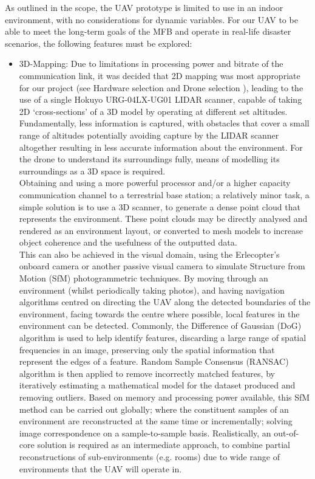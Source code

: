\documentclass[capstone_report.tex]{subfiles}
\begin{document}
As outlined in the scope, the UAV prototype is limited to use in an indoor environment, with no considerations for dynamic variables. For our UAV to be able to meet the long-term goals of the MFB and operate in real-life disaster scenarios, the following features must be explored:
\begin{itemize}
\item 3D-Mapping: Due to limitations in processing power and bitrate of the communication link, it was decided that 2D mapping was most appropriate for our project (see Hardware selection and Drone selection ), leading to the use of a single Hokuyo URG-04LX-UG01 LIDAR scanner, capable of taking 2D ‘cross-sections’ of a 3D model by operating at different set altitudes. Fundamentally, less information is captured, with obstacles that cover a small range of altitudes potentially avoiding capture by the LIDAR scanner altogether resulting in less accurate information about the environment. For the drone to understand its surroundings fully, means of modelling its surroundings as a 3D space is required.  \\

Obtaining and using a more powerful processor and/or a higher capacity communication channel to a terrestrial base station; a relatively minor task, a simple solution is to use a 3D scanner, to generate a dense point cloud that represents the environment. These point clouds may be directly analysed and rendered as an environment layout, or converted to mesh models to increase object coherence and the usefulness of the outputted data. \\

This can also be achieved in the visual domain, using the Erlecopter’s onboard camera or another passive visual camera to simulate Structure from Motion (SfM) photogrammetric techniques. By moving through an environment (whilst periodically taking photos), and having navigation algorithms centred on directing the UAV along the detected boundaries of the environment, facing towards the centre where possible, local features in the environment can be detected. Commonly, the Difference of Gaussian (DoG) algorithm is used to help identify features, discarding a large range of spatial frequencies in an image, preserving only the spatial information that represent the edges of a feature. Random Sample Consensus (RANSAC) algorithm is then applied to remove incorrectly matched features, by iteratively estimating a mathematical model for the dataset produced and removing outliers. Based on memory and processing power available, this SfM method can be carried out globally; where the constituent samples of an environment are reconstructed at the same time or incrementally; solving image correspondence on a sample-to-sample basis. Realistically, an out-of-core solution is required as an intermediate approach, to combine partial reconstructions of sub-environments (e.g. rooms) due to wide range of environments that the UAV will operate in.\\


\end{itemize}
\end{document}
